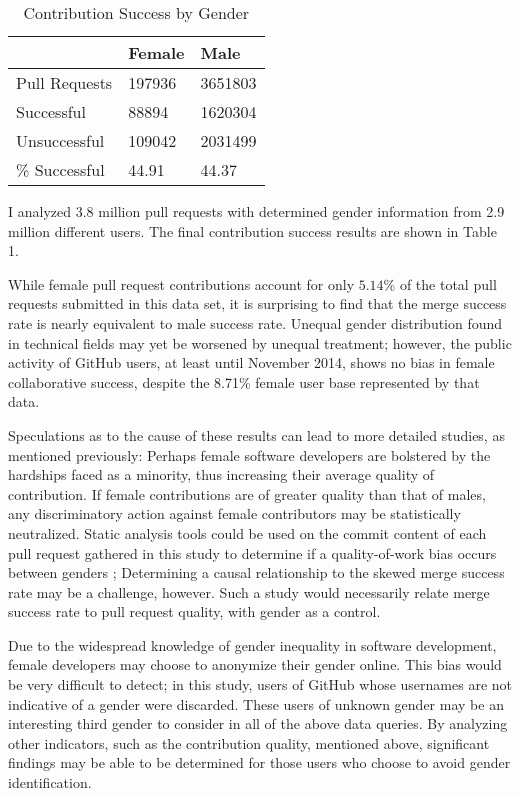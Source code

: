 \documentclass{sigplanconf}
\begin{document}
\begin{table}[h]
  \begin{center}
    \begin{tabular}{l|l|l}
      & Female & Male\\ \hline
      Pull Requests & \num{197936} & \num{3651803} \\ \hline
      Successful  & \num{88894} & \num{1620304} \\ \hline
      Unsuccessful  & \num{109042} & \num{2031499} \\ \hline
      \% Successful & \num{44.91} & \num{44.37} \\ \hline
    \end{tabular}
    \caption{Contribution Success by Gender}
  \end{center}
\end{table}

I analyzed 3.8 million pull requests with determined gender information from
2.9 million different users. The final contribution success results are shown in Table 1.

While female pull request contributions account for only $5.14\%$ of the total pull
requests submitted in this data set, it is surprising to find that the merge
success rate is nearly equivalent to male success rate. Unequal gender
distribution found in technical fields may yet be worsened by unequal treatment;
however, the public activity of GitHub users, at least until November 2014,
shows no bias in female collaborative success, despite the 8.71\% female
user base represented by that data.

Speculations as to the cause of these results can lead to more detailed studies,
as mentioned previously:
Perhaps female software developers are bolstered by the hardships faced as a
minority, thus increasing their average quality of contribution. If female
contributions are of greater quality than that of males, any discriminatory
action against female contributors may be statistically neutralized. Static
analysis tools could be used on the commit content of each pull request gathered
in this study to determine if a quality-of-work bias occurs between genders
\cite{staticanalysis}; Determining a causal relationship to the skewed merge success rate may be a
challenge, however. Such a study would necessarily relate merge success rate to
pull request quality, with gender as a control.

Due to the widespread knowledge of gender inequality in software development,
female developers may choose to anonymize their gender online. This bias would
be very difficult to detect; in this study, users of GitHub whose usernames are
not indicative of a gender were discarded. These users of unknown gender may be
an interesting third gender to consider in all of the above data queries. By
analyzing other indicators, such as the contribution quality, mentioned above,
significant findings may be able to be determined for those users who choose to
avoid gender identification.
\end{document}
